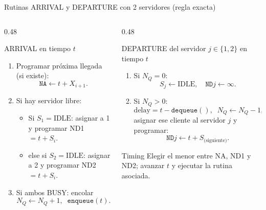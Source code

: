 \documentclass[aspectratio=1610, 9pt]{beamer}
\begin{document}
\begin{frame}{Rutinas ARRIVAL y DEPARTURE con 2 servidores (regla exacta)}
\small
\begin{columns}[T,totalwidth=\textwidth]
\begin{column}{0.48\textwidth}
\begin{block}{ARRIVAL en tiempo $t$}
\begin{enumerate}
\item Programar próxima llegada (si existe):
\[
\texttt{NA} \leftarrow t + X_{i+1}.
\]
\item Si hay servidor libre:
\begin{itemize}
\item Si $S_1=\text{IDLE}$: asignar a 1 y programar ND1 $=t+S_i$.
\item else si $S_2=\text{IDLE}$: asignar a 2 y programar ND2 $=t+S_i$.
\end{itemize}
\item Si ambos BUSY: encolar
\[
N_Q\leftarrow N_Q+1,\;\; \texttt{enqueue}(t).
\]
\end{enumerate}
\end{block}
\end{column}

\begin{column}{0.48\textwidth}
\begin{block}{DEPARTURE del servidor $j\in\{1,2\}$ en tiempo $t$}
\begin{enumerate}
\item Si $N_Q=0$:
\[
S_j\leftarrow \text{IDLE},\quad \texttt{ND}j \leftarrow \infty.
\]
\item Si $N_Q>0$:
\[
\text{delay}=t-\texttt{dequeue}(),\;\; N_Q\leftarrow N_Q-1,
\]
asignar ese cliente al servidor $j$ y programar:
\[
\texttt{ND}j \leftarrow t + S_{\text{(siguiente)}}.
\]
\end{enumerate}
\end{block}


\begin{block}{Timing}
Elegir el menor entre NA, ND1 y ND2; avanzar $t$ y ejecutar la rutina asociada.
\end{block}
\end{column}
\end{columns}
\end{frame}
\end{document}
